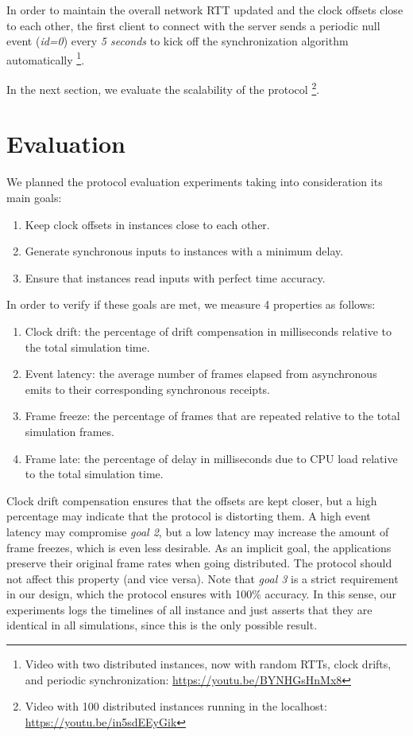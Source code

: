 \documentclass[sigplan,screen]{acmart}
\begin{document}
In order to maintain the overall network RTT updated and the clock offsets
close to each other, the first client to connect with the server sends a
periodic null event (\emph{id=0}) every \emph{5 seconds} to kick off the
synchronization algorithm automatically%
\footnote {
    Video with two distributed instances, now with random RTTs, clock drifts,
    and periodic synchronization:
    \url{https://youtu.be/BYNHGsHnMx8}
}.

In the next section, we evaluate the scalability of the protocol%
\footnote {
    Video with 100 distributed instances running in the localhost:
    \url{https://youtu.be/in5sdEEyGik}
}.

\section{Evaluation}
\label{sec.eval}

We planned the protocol evaluation experiments taking into consideration its
main goals:
%
\begin{enumerate}
\item Keep clock offsets in instances close to each other.
\item Generate synchronous inputs to instances with a minimum delay.
\item Ensure that instances read inputs with perfect time accuracy.
\end{enumerate}
%
In order to verify if these goals are met, we measure 4 properties as follows:
%
\begin{enumerate}
\item Clock drift:   the percentage of drift compensation in milliseconds
                     relative to the total simulation time.
\item Event latency: the average number of frames elapsed from asynchronous
                     emits to their corresponding synchronous receipts.
\item Frame freeze:  the percentage of frames that are repeated relative to the
                     total simulation frames.
\item Frame late:    the percentage of delay in milliseconds due to CPU load
                     relative to the total simulation time.
\end{enumerate}
%
Clock drift compensation ensures that the offsets are kept closer, but a high
percentage may indicate that the protocol is distorting them.
%
A high event latency may compromise \emph{goal 2}, but a low latency may
increase the amount of frame freezes, which is even less desirable.
%
As an implicit goal, the applications preserve their original frame rates when
going distributed.
The protocol should not affect this property (and vice versa).
%
Note that \emph{goal 3} is a strict requirement in our design, which the
protocol ensures with 100\% accuracy.
In this sense, our experiments logs the timelines of all instance and just
asserts that they are identical in all simulations, since this is the only
possible result.
\end{document}

